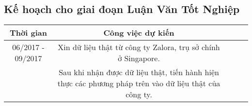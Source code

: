 \documentclass[a4paper,12pt,numbered,print,index,custombib, oneside, custommargin]{report}
\begin{document}
\subsection{Kế hoạch cho giai đoạn Luận Văn Tốt Nghiệp}
\begin{center}
\begin{tabular} { |c|c|c|c|c| } 
\hline
Thời gian & Công việc dự kiến \\
\hline
06/2017 - 09/2017 & Xin dữ liệu thật từ công ty Zalora, trụ sở chính ở Singapore. \\
& Sau khi nhận được dữ liệu thật, tiến hành hiện thực các phương pháp trên vào dữ liệu thật của công ty. \\
%
\end{tabular}
\end{center}






%
%


\newpage


\end{document}
